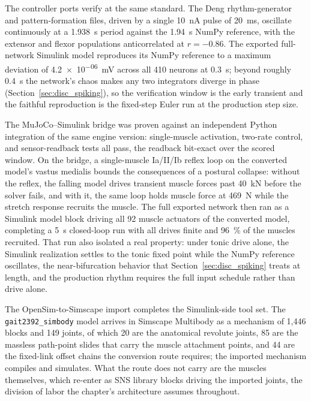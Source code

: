 The controller ports verify at the same standard. The Deng rhythm-generator and pattern-formation files, driven by a single \qty{10}{\nA} pulse of \qty{20}{\milli\second}, oscillate continuously at a \qty{1.938}{\second} period against the \qty{1.94}{\second} NumPy reference, with the extensor and flexor populations anticorrelated at $r = -0.86$. The exported full-network Simulink model reproduces its NumPy reference to a maximum deviation of \qty{4.2e-06}{\milli\volt} across all 410 neurons at \qty{0.3}{\second}; beyond roughly \qty{0.4}{\second} the network's chaos makes any two integrators diverge in phase (Section~\ref{sec:disc_spiking}), so the verification window is the early transient and the faithful reproduction is the fixed-step Euler run at the production step size.

The MuJoCo--Simulink bridge was proven against an independent Python integration of the same engine version: single-muscle activation, two-rate control, and sensor-readback tests all pass, the readback bit-exact over the scored window. On the bridge, a single-muscle Ia/II/Ib reflex loop on the converted model's vastus medialis bounds the consequences of a postural collapse: without the reflex, the falling model drives transient muscle forces past \qty{40}{\kilo\newton} before the solver fails, and with it, the same loop holds muscle force at \qty{469}{\newton} while the stretch response recruits the muscle. The full exported network then ran as a Simulink model block driving all 92 muscle actuators of the converted model, completing a \qty{5}{\second} closed-loop run with all drives finite and \qty{96}{\percent} of the muscles recruited. That run also isolated a real property: under tonic drive alone, the Simulink realization settles to the tonic fixed point while the NumPy reference oscillates, the near-bifurcation behavior that Section~\ref{sec:disc_spiking} treats at length, and the production rhythm requires the full input schedule rather than drive alone.

The OpenSim-to-Simscape import completes the Simulink-side tool set. The \texttt{gait2392\_simbody} model arrives in Simscape Multibody as a mechanism of 1,446 blocks and 149 joints, of which 20 are the anatomical revolute joints, 85 are the massless path-point slides that carry the muscle attachment points, and 44 are the fixed-link offset chains the conversion route requires; the imported mechanism compiles and simulates. What the route does not carry are the muscles themselves, which re-enter as SNS library blocks driving the imported joints, the division of labor the chapter's architecture assumes throughout.

